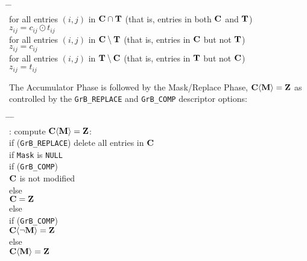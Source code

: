 \documentclass[12pt]{article}
\begin{document}
    {\small
    \begin{tabbing}
    \hspace{2em} \= \hspace{2em} \= \hspace{2em} \= \\
    \> for all entries $(i,j)$ in ${\bf C \cap T}$
    (that is, entries in both ${\bf C}$ and ${\bf T}$) \\
    \> \> $z_{ij} = c_{ij} \odot t_{ij}$ \\
    \> for all entries $(i,j)$ in ${\bf C \setminus T}$
    (that is, entries in ${\bf C}$ but not ${\bf T}$) \\
    \> \> $z_{ij} = c_{ij}$ \\
    \> for all entries $(i,j)$ in ${\bf T \setminus C}$
    (that is, entries in ${\bf T}$ but not ${\bf C}$) \\
    \> \> $z_{ij} = t_{ij}$
    \end{tabbing} }
The Accumulator Phase is followed by the Mask/Replace Phase,
${\bf C \langle M \rangle = Z}$
as controlled by the \verb'GrB_REPLACE' and \verb'GrB_COMP' descriptor options:
    \vspace{-0.2in}
    {\small
    \begin{tabbing}
    \hspace{2em} \= \hspace{2em} \= \hspace{2em} \= \hspace{2em} \= \\
    : compute ${\bf C \langle M \rangle = Z}$: \\
    \> \> if (\verb'GrB_REPLACE') delete all entries in ${\bf C}$ \\
    \> \> if \verb'Mask' is \verb'NULL' \\
    \> \>\>    if (\verb'GrB_COMP') \\
    \> \>\>\>      ${\bf C}$ is not modified \\
    \> \>\>    else \\
    \> \>\>\>      ${\bf C = Z}$ \\
    \> \> else \\
    \> \>\>    if (\verb'GrB_COMP') \\
    \> \>\>\>      ${\bf C \langle \neg M \rangle  = Z}$ \\
    \> \>\>    else \\
    \> \>\>\>      ${\bf C \langle M \rangle  = Z}$
    \end{tabbing} }
\end{document}
